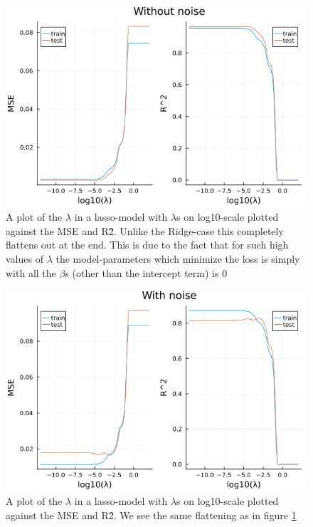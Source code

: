 \documentclass{article}
\begin{document}
\begin{figure}
    \centerline{\includegraphics[scale=0.5]{lasso_without_noise}}
    \caption{A plot of the $\lambda$ in a lasso-model with $\lambda$s on log10-scale plotted against the MSE and R\^2. Unlike the Ridge-case this completely flattens out at the end. This is due to the fact that for such high values of $\lambda$ the model-parameters which minimize the loss is simply with all the $\beta$s (other than the intercept term) is $0$}
    \label{Lasso-no-noise}
\end{figure}
\begin{figure}
    \centerline{\includegraphics[scale=0.5]{lasso_with_noise}}
    \caption{A plot of the $\lambda$ in a lasso-model with $\lambda$s on log10-scale plotted against the MSE and R\^2. We see the same flattening as in figure \ref{Lasso-no-noise}}
    \label{Lasso-with-noise}
\end{figure}
\end{document}

